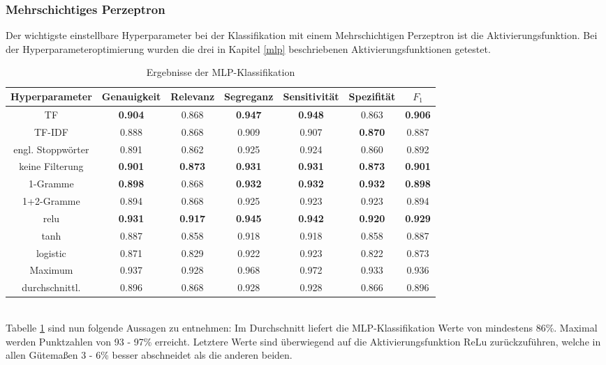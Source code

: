 \subsubsection{Mehrschichtiges Perzeptron}
Der wichtigste einstellbare Hyperparameter bei der Klassifikation mit einem Mehrschichtigen Perzeptron ist die Aktivierungsfunktion. Bei der Hyperparameteroptimierung wurden die drei in Kapitel \ref{mlp} beschriebenen Aktivierungsfunktionen getestet.
\begin{table}[htb]
	\begin{center}
		\begin{tabular}{|c|c|c|c|c|c|c|}
			\hline 
			Hyperparameter & Genauigkeit & Relevanz & Segreganz & Sensitivität & Spezifität & $F_1$ \\ \hline \hline
			TF       & \textbf{0.904} & 0.868 & \textbf{0.947} & \textbf{0.948} & 0.863 & \textbf{0.906} \\ \hline
			TF-IDF   & 0.888 & 0.868 & 0.909 & 0.907 & \textbf{0.870} & 0.887 \\ \hline \hline
			engl. Stoppwörter & 0.891 & 0.862 & 0.925 & 0.924 & 0.860 & 0.892 \\ \hline 
			keine Filterung   & \textbf{0.901} & \textbf{0.873} & \textbf{0.931} & \textbf{0.931} & \textbf{0.873} & \textbf{0.901} \\ \hline\hline
			1-Gramme   & \textbf{0.898} & 0.868 & \textbf{0.932} & \textbf{0.932} & \textbf{0.932} & \textbf{0.898} \\ \hline
			1+2-Gramme  & 0.894 & 0.868 & 0.925 & 0.923 & 0.923 & 0.894 \\ \hline \hline
			relu & \textbf{0.931} & \textbf{0.917} & \textbf{0.945} & \textbf{0.942} & \textbf{0.920} & \textbf{0.929} \\ \hline
			tanh & 0.887 & 0.858 & 0.918 & 0.918 & 0.858 & 0.887 \\ \hline
			logistic & 0.871 & 0.829 & 0.922 & 0.923 & 0.822 & 0.873 \\ \hline
			\hline
			Maximum        & 0.937 & 0.928 & 0.968 & 0.972 & 0.933 & 0.936 \\ \hline
			durchschnittl. & 0.896 & 0.868 & 0.928 & 0.928 & 0.866 & 0.896 \\ \hline
		\end{tabular}
		\caption{Ergebnisse der MLP-Klassifikation}\label{results-mlp}
	\end{center}
\end{table}\\
Tabelle \ref{results-mlp} sind nun folgende Aussagen zu entnehmen: Im Durchschnitt liefert die MLP-Klassifikation Werte von mindestens 86\%. Maximal werden Punktzahlen von 93 - 97\% erreicht. Letztere Werte sind überwiegend auf die Aktivierungsfunktion ReLu zurückzuführen, welche in allen Gütemaßen 3 - 6\% besser abschneidet als die anderen beiden.\\
